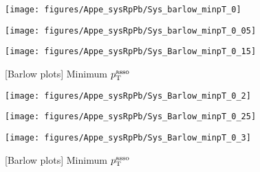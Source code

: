 \begin{itemize}
      \begin{figure}[H]
      	\begin{minipage}{0.33\hsize} 
      	\begin{center}
      	\texttt{[image: figures/Appe\_sysRpPb/Sys\_barlow\_minpT\_0]}
      	\end{center}
      	\end{minipage}
      	\begin{minipage}{0.33\hsize} 
      	\begin{center}
      	\texttt{[image: figures/Appe\_sysRpPb/Sys\_barlow\_minpT\_0\_05]}
      	\end{center}
      	\end{minipage}
      	\begin{minipage}{0.33\hsize} 
      	\begin{center}
      	\texttt{[image: figures/Appe\_sysRpPb/Sys\_Barlow\_minpT\_0\_15]}
      	\end{center}
      	\end{minipage}
      \caption{[Barlow plots] Minimum $p_{\rm{T}}^{\rm{asso}}$}
      \label{fig:Sys_MinpT}
      \end{figure}
      
      \begin{figure}[H]
      	\begin{minipage}{0.33\hsize} 
      	\begin{center}
      	\texttt{[image: figures/Appe\_sysRpPb/Sys\_Barlow\_minpT\_0\_2]}
      	\end{center}
      	\end{minipage}
      	\begin{minipage}{0.33\hsize} 
      	\begin{center}
      	\texttt{[image: figures/Appe\_sysRpPb/Sys\_Barlow\_minpT\_0\_25]}
      	\end{center}
      	\end{minipage}
      	\begin{minipage}{0.33\hsize} 
      	\begin{center}
      	\texttt{[image: figures/Appe\_sysRpPb/Sys\_Barlow\_minpT\_0\_3]}
      	\end{center}
      	\end{minipage}
      \caption{[Barlow plots] Minimum $p_{\rm{T}}^{\rm{asso}}$}
      \label{fig:Sys_MinpT}
      \end{figure}
      
 \end{itemize}


